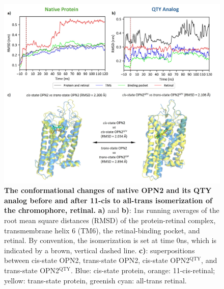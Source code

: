 \documentclass[fleqn, 10pt, lineno]{manuscript}
\begin{document}
\begin{figure}[htbp]
	\centering
	\includegraphics[width=\linewidth]{Figures/function-conformation.jpg}
	\caption{\textbf{The conformational changes of native OPN2 and its QTY analog before and after 11-cis to all-trans isomerization of the chromophore, retinal. } \textbf{a)} and \textbf{b)}: 1ns running averages of the root mean square distances (RMSD) of the protein-retinal complex, transmembrane helix 6 (TM6), the retinal-binding pocket, and retinal. By convention, the isomerization is set at time 0ns, which is indicated by a brown, vertical dashed line. \textbf{c)}: superpositions between cis-state OPN2, trans-state OPN2, cis-state OPN2$^{\textrm{QTY}}$, and trans-state OPN2$^{\textrm{QTY}}$. Blue: cis-state protein, orange: 11-cis-retinal; yellow: trans-state protein, greenish cyan: all-trans retinal. }
	\label{fig:conformation}
\end{figure}
\end{document}
